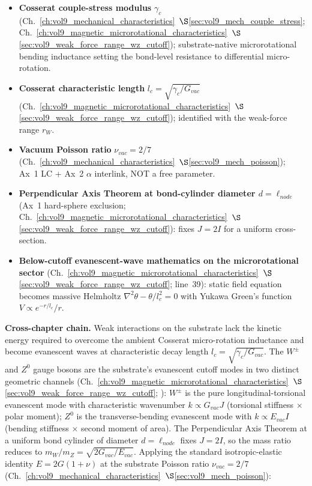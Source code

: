 \begin{itemize}
    \item \textbf{Cosserat couple-stress modulus} $\gamma_c$ (Ch.~\ref{ch:vol9_mechanical_characteristics}~$\S$\ref{sec:vol9_mech_couple_stress}; Ch.~\ref{ch:vol9_magnetic_microrotational_characteristics}~$\S$\ref{sec:vol9_weak_force_range_wz_cutoff}); substrate-native microrotational bending inductance setting the bond-level resistance to differential micro-rotation.
    \item \textbf{Cosserat characteristic length} $l_c = \sqrt{\gamma_c/G_{vac}}$ (Ch.~\ref{ch:vol9_magnetic_microrotational_characteristics}~$\S$\ref{sec:vol9_weak_force_range_wz_cutoff}); identified with the weak-force range $r_W$.
    \item \textbf{Vacuum Poisson ratio} $\nu_{vac} = 2/7$ (Ch.~\ref{ch:vol9_mechanical_characteristics}~$\S$\ref{sec:vol9_mech_poisson}); Ax~1 LC + Ax~2 $\alpha$ interlink, NOT a free parameter.
    \item \textbf{Perpendicular Axis Theorem at bond-cylinder diameter $d = \ell_{node}$} (Ax~1 hard-sphere exclusion; Ch.~\ref{ch:vol9_magnetic_microrotational_characteristics}~$\S$\ref{sec:vol9_weak_force_range_wz_cutoff}): fixes $J = 2I$ for a uniform cross-section.
    \item \textbf{Below-cutoff evanescent-wave mathematics on the microrotational sector} (Ch.~\ref{ch:vol9_magnetic_microrotational_characteristics}~$\S$\ref{sec:vol9_weak_force_range_wz_cutoff};  line~39): static field equation becomes massive Helmholtz $\nabla^2\theta - \theta/l_c^2 = 0$ with Yukawa Green's function $V \propto e^{-r/l_c}/r$.
\end{itemize}

\textbf{Cross-chapter chain.} Weak interactions on the substrate lack the kinetic energy required to overcome the ambient Cosserat micro-rotation inductance and become evanescent waves at characteristic decay length $l_c = \sqrt{\gamma_c/G_{vac}}$. The $W^\pm$ and $Z^0$ gauge bosons are the substrate's evanescent cutoff modes in two distinct geometric channels (Ch.~\ref{ch:vol9_magnetic_microrotational_characteristics}~$\S$\ref{sec:vol9_weak_force_range_wz_cutoff}; ): $W^\pm$ is the pure longitudinal-torsional evanescent mode with characteristic wavenumber $k \propto G_{vac} J$ (torsional stiffness $\times$ polar moment); $Z^0$ is the transverse-bending evanescent mode with $k \propto E_{vac} I$ (bending stiffness $\times$ second moment of area). The Perpendicular Axis Theorem at a uniform bond cylinder of diameter $d = \ell_{node}$ fixes $J = 2I$, so the mass ratio reduces to $m_W/m_Z = \sqrt{2 G_{vac}/E_{vac}}$. Applying the standard isotropic-elastic identity $E = 2G(1+\nu)$ at the substrate Poisson ratio $\nu_{vac} = 2/7$ (Ch.~\ref{ch:vol9_mechanical_characteristics}~$\S$\ref{sec:vol9_mech_poisson}):

